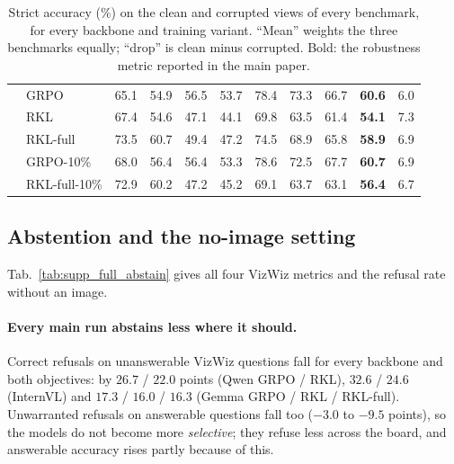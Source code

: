 \begin{table}[t]
\begin{tabular}{llcccccc|ccc}
 & GRPO & 65.1 & 54.9 & 56.5 & 53.7 & 78.4 & 73.3 & 66.7 & \textbf{60.6} & 6.0 \\
 & RKL & 67.4 & 54.6 & 47.1 & 44.1 & 69.8 & 63.5 & 61.4 & \textbf{54.1} & 7.3 \\
 & RKL-full & 73.5 & 60.7 & 49.4 & 47.2 & 74.5 & 68.9 & 65.8 & \textbf{58.9} & 6.9 \\
 & GRPO-10\% & 68.0 & 56.4 & 56.4 & 53.3 & 78.6 & 72.5 & 67.7 & \textbf{60.7} & 6.9 \\
 & RKL-full-10\% & 72.9 & 60.2 & 47.2 & 45.2 & 69.1 & 63.7 & 63.1 & \textbf{56.4} & 6.7 \\
\bottomrule
\end{tabular}
\caption{Strict accuracy (\%) on the clean and corrupted views of every benchmark, for every
backbone and training variant. ``Mean'' weights the three benchmarks equally; ``drop'' is
clean minus corrupted. Bold: the robustness metric reported in the main paper.}
\label{tab:supp_full_bench}
\end{table}

\subsection{Abstention and the no-image setting}
\label{sec:supp_full_abstain}

Tab.~\ref{tab:supp_full_abstain} gives all four VizWiz metrics and the refusal rate without
an image.

\paragraph{Every main run abstains less where it should.}
Correct refusals on unanswerable VizWiz questions fall for every backbone and both
objectives: by $26.7$ / $22.0$ points (Qwen GRPO / RKL), $32.6$ / $24.6$ (InternVL) and
$17.3$ / $16.0$ / $16.3$ (Gemma GRPO / RKL / RKL-full). Unwarranted refusals on answerable
questions fall too ($-3.0$ to $-9.5$ points), so the models do not become more
\emph{selective}; they refuse less across the board, and answerable accuracy rises partly
because of this.

